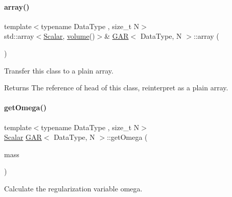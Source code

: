 \paragraph{\texorpdfstring{array()}{array()}}
{\footnotesize\ttfamily template$<$typename Data\+Type , size\+\_\+t N$>$ \\
std\+::array$<$\mbox{\hyperlink{class_g_a_r_a2ae44eda8e28d5dd26cf707dcda69314}{Scalar}}, \mbox{\hyperlink{class_g_a_r_abdbcc31db058125bd2ee207e7648b20b}{volume}}()$>$\& \mbox{\hyperlink{class_g_a_r}{G\+AR}}$<$ Data\+Type, N $>$\+::array (\begin{DoxyParamCaption}{ }\end{DoxyParamCaption})\hspace{0.3cm}{\ttfamily [inline]}}



Transfer this class to a plain array. 

\begin{DoxyReturn}{Returns}
The reference of head of this class, reinterpret as a plain array. 
\end{DoxyReturn}
\mbox{\label{class_g_a_r_a3d5871f25d147497399fa65343bca84a}} 
\paragraph{\texorpdfstring{get\+Omega()}{getOmega()}}
{\footnotesize\ttfamily template$<$typename Data\+Type , size\+\_\+t N$>$ \\
\mbox{\hyperlink{class_g_a_r_a2ae44eda8e28d5dd26cf707dcda69314}{Scalar}} \mbox{\hyperlink{class_g_a_r}{G\+AR}}$<$ Data\+Type, N $>$\+::get\+Omega (\begin{DoxyParamCaption}\item[{const \mbox{\hyperlink{class_g_a_r_a0b446684ae922457a3bf86c904085d8a}{Scalar\+Array}} \&}]{mass }\end{DoxyParamCaption})\hspace{0.3cm}{\ttfamily [inline]}}



Calculate the regularization variable omega. 


